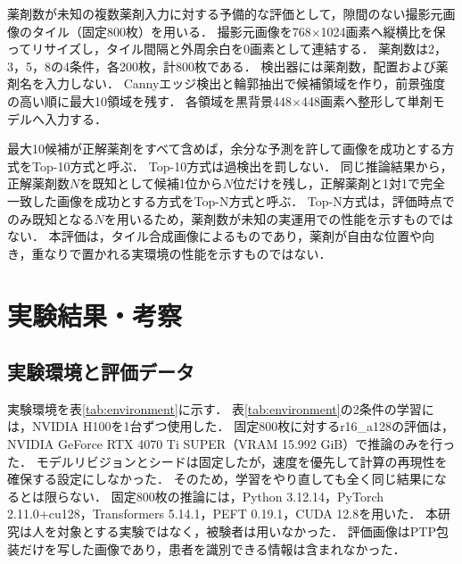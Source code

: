 \documentclass[uplatex,dvipdfmx]{jsarticle}
\begin{document}
薬剤数が未知の複数薬剤入力に対する予備的な評価として，隙間のない撮影元画像のタイル（固定800枚）を用いる．
撮影元画像を768$\times$1024画素へ縦横比を保ってリサイズし，タイル間隔と外周余白を0画素として連結する．
薬剤数は2，3，5，8の4条件，各200枚，計800枚である．
検出器には薬剤数，配置および薬剤名を入力しない．
Cannyエッジ検出と輪郭抽出で候補領域を作り，前景強度の高い順に最大10領域を残す．
各領域を黒背景448$\times$448画素へ整形して単剤モデルへ入力する．

最大10候補が正解薬剤をすべて含めば，余分な予測を許して画像を成功とする方式をTop-10方式と呼ぶ．
Top-10方式は過検出を罰しない．
同じ推論結果から，正解薬剤数$N$を既知として候補1位から$N$位だけを残し，正解薬剤と1対1で完全一致した画像を成功とする方式をTop-N方式と呼ぶ．
Top-N方式は，評価時点でのみ既知となる$N$を用いるため，薬剤数が未知の実運用での性能を示すものではない．
本評価は，タイル合成画像によるものであり，薬剤が自由な位置や向き，重なりで置かれる実環境の性能を示すものではない．


\clearpage
\section{実験結果・考察}\label{sec:results}

\subsection{実験環境と評価データ}\label{sec:env_data}

実験環境を表\ref{tab:environment}に示す．
表\ref{tab:environment}の2条件の学習には，NVIDIA H100を1台ずつ使用した．
固定800枚に対するr16\_a128の評価は，NVIDIA GeForce RTX 4070 Ti SUPER（VRAM 15.992 GiB）で推論のみを行った．
モデルリビジョンとシードは固定したが，速度を優先して計算の再現性を確保する設定にしなかった．
そのため，学習をやり直しても全く同じ結果になるとは限らない．
固定800枚の推論には，Python 3.12.14，PyTorch 2.11.0+cu128，Transformers 5.14.1，PEFT 0.19.1，CUDA 12.8を用いた．
本研究は人を対象とする実験ではなく，被験者は用いなかった．
評価画像はPTP包装だけを写した画像であり，患者を識別できる情報は含まれなかった．
\end{document}

